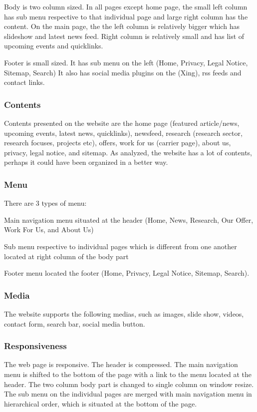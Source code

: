 Body is two column sized. In all pages except home page, the small left column has sub menu respective to that individual page and large right column has the content. On the main page, the the left column is relatively bigger which has slideshow and latest news feed. Right column is relatively small and has list of upcoming events and quicklinks.

Footer is small sized. It has sub menu on the left (Home, Privacy, Legal Notice, Sitemap, Search) It also has social media plugins on the (Xing), \ac{rss} feeds and contact links.

\subsubsection*{Contents}
Contents presented on the website are the home page (featured article/news, upcoming events, latest news, quicklinks), newsfeed, research (research sector, research focuses, projects etc), offers, work for us (carrier page), about us, privacy, legal notice, and sitemap. As analyzed, the website has a lot of contents, perhaps it could have been organized in a better way.

\subsubsection*{Menu}
There are 3 types of menu:
\begin{itemize*}
\item Main navigation menu situated at the header (Home, News, Research, Our Offer, Work For Us, and About Us)
\item Sub menu respective to individual pages which is different from one another located at right column of the body part
\item Footer menu located the footer (Home, Privacy, Legal Notice, Sitemap, Search).
\end{itemize*}

\subsubsection*{Media}
The website supports the following medias, such as images, slide show, videos, contact form, search bar, social media button.

\subsubsection*{Responsiveness}
The web page is responsive. The header is compressed. The main navigation menu is shifted to the bottom of the page with a link to the menu located at the header. The two column body part is changed to single column on window resize. The sub menu on the individual pages are merged with main navigation menu in hierarchical order, which is situated at the bottom of the page.

